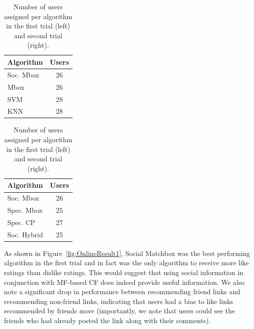 \begin{table}[t!]
\centering
\begin{minipage}{1.5in}
\begin{tabular}{| l | c |}
\hline
{\bf Algorithm} & {\bf Users} \\
\hline
Soc. Mbox & 26\\
Mbox  & 26 \\
SVM & 28 \\
KNN & 28 \\
\hline
\end{tabular}
  \end{minipage}
  \begin{minipage}{1.3in}
\begin{tabular}{| l | c |}
\hline
{\bf Algorithm} & {\bf Users} \\
\hline
Soc. Mbox & 26\\
Spec. Mbox  & 25 \\
Spec. CP & 27 \\
Soc. Hybrid & 25 \\
\hline
\end{tabular}
  \end{minipage}
\caption{Number of users assigned per algorithm in the first trial (left)
and second trial (right).}
\label{tab:Assigned1}
\end{table}

As shown in Figure~\ref{fig:OnlineResult1}, Social Matchbox was the
best performing algorithm in the first trial and in fact was the only
algorithm to receive more like ratings than dislike ratings. This
would suggest that using social information in conjunction with
MF-based CF does indeed provide useful information.  We also note a
significant drop in performance between recommending friend links and
recommending non-friend links, indicating that users had a bias to
like links recommended by friends more (importantly, we note that
users could see the friends who had already posted the link along with
their comments).

